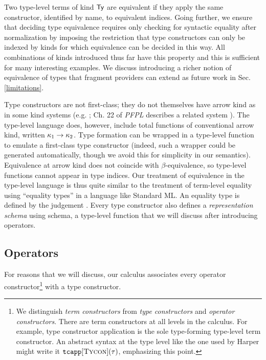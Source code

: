 \documentclass[9pt,preprint]{sigplanconf}
\begin{document}
Two type-level terms of kind $\textsf{Ty}$ are equivalent if they apply the same constructor, identified by name, to equivalent indices. Going further, we ensure that deciding type equivalence requires only checking for syntactic equality after normalization by imposing the restriction that type constructors can only be indexed by kinds for which equivalence can be decided in this way. All combinations of kinds introduced thus far  have this property and this is sufficient for many interesting examples. We discuss introducing a richer notion of  equivalence of types that  fragment providers can extend as future work in Sec. \ref{limitations}.%

Type constructors are not first-class; they do not themselves have arrow kind as in some kind systems (e.g.  \cite{Watkins08}; Ch. 22 of \emph{PFPL} describes a related system \cite{pfpl}). The type-level language does, however, include total functions of conventional arrow kind, written $\kappa_1\rightarrow{\kappa_2}$. Type formation can be wrapped in a type-level function to emulate a first-class type constructor (indeed, such a wrapper could be generated automatically, though we avoid this for simplicity in our semantics). Equivalence at arrow kind does not coincide with $\beta$-equivalence, so type-level functions cannot appear in type indices. Our treatment of equivalence in the type-level language is thus quite similar to the treatment of term-level equality using ``equality types'' in a language like Standard ML. An equality type is defined by the judgement . 
Every type constructor also defines a \emph{representation schema} using \textsf{schema}, a type-level function that we will discuss after introducing operators. 

\subsection{Operators}
For reasons that we will discuss, our calculus associates every operator  constructor\footnote{We distinguish \emph{term constructors} from \emph{type constructors} and \emph{operator constructors}. There are term constructors at all levels in the calculus. For example, type constructor application is the sole type-forming type-level term constructor. An abstract syntax at the type level like the one used by Harper \cite{pfpl} might write it $\texttt{tcapp}[\textsc{Tycon}](\tau)$, emphasizing this point.} with a type constructor.
\end{document}
